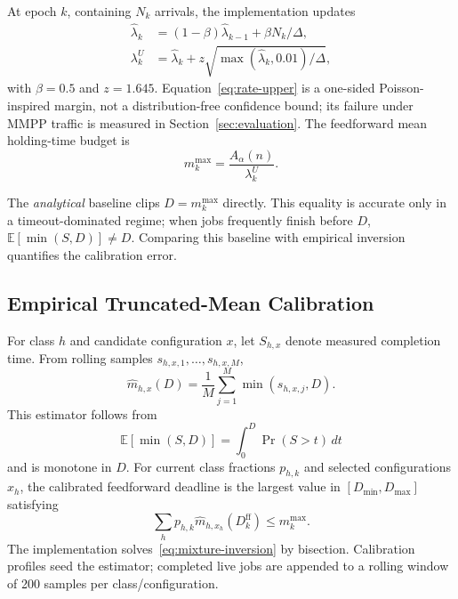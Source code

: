 \documentclass[journal]{IEEEtran}
\begin{document}
At epoch $k$, containing $N_k$ arrivals, the implementation updates
\begin{align}
 \widehat\lambda_k&=(1-\beta)\widehat\lambda_{k-1}+\beta N_k/\Delta,\\
 \lambda_k^{U}&=\widehat\lambda_k+z\sqrt{\max(\widehat\lambda_k,0.01)/\Delta},
 \label{eq:rate-upper}
\end{align}
with $\beta=0.5$ and $z=1.645$. Equation~\eqref{eq:rate-upper} is a one-sided Poisson-inspired margin, not a distribution-free confidence bound; its failure under MMPP traffic is measured in Section~\ref{sec:evaluation}. The feedforward mean holding-time budget is
\begin{equation}
 m_k^{\max}=\frac{A_\alpha(n)}{\lambda_k^{U}}.
 \label{eq:mean-budget}
\end{equation}

The \emph{analytical} baseline clips $D=m_k^{\max}$ directly. This equality is accurate only in a timeout-dominated regime; when jobs frequently finish before $D$, $\mathbb{E}[\min(S,D)]\neq D$. Comparing this baseline with empirical inversion quantifies the calibration error.

\subsection{Empirical Truncated-Mean Calibration}

For class $h$ and candidate configuration $x$, let $S_{h,x}$ denote measured completion time. From rolling samples $s_{h,x,1},\ldots,s_{h,x,M}$,
\begin{equation}
 \widehat m_{h,x}(D)=\frac{1}{M}\sum_{j=1}^{M}\min(s_{h,x,j},D).
 \label{eq:empirical-truncated}
\end{equation}
This estimator follows from
\begin{equation}
 \mathbb{E}[\min(S,D)]=\int_0^D \Pr(S>t)\,dt
\end{equation}
and is monotone in $D$. For current class fractions $p_{h,k}$ and selected configurations $x_h$, the calibrated feedforward deadline is the largest value in $[D_{\min},D_{\max}]$ satisfying
\begin{equation}
 \sum_h p_{h,k}\widehat m_{h,x_h}(D_k^{\mathrm{ff}})\le m_k^{\max}.
 \label{eq:mixture-inversion}
\end{equation}
The implementation solves~\eqref{eq:mixture-inversion} by bisection. Calibration profiles seed the estimator; completed live jobs are appended to a rolling window of 200 samples per class/configuration.
\end{document}

